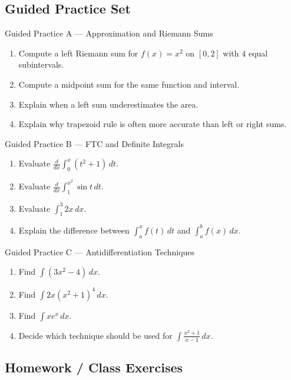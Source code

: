 \documentclass[11pt]{article}
\begin{document}
\newpage
\subsection{Guided Practice Set}

\begin{practicebox}{Guided Practice A --- Approximation and Riemann Sums}
\begin{enumerate}
    \item Compute a left Riemann sum for \(f(x)=x^2\) on \([0,2]\) with \(4\) equal subintervals.
    \item Compute a midpoint sum for the same function and interval.
    \item Explain when a left sum underestimates the area.
    \item Explain why trapezoid rule is often more accurate than left or right sums.
\end{enumerate}
\end{practicebox}

\begin{practicebox}{Guided Practice B --- FTC and Definite Integrals}
\begin{enumerate}
    \item Evaluate \(\frac{d}{dx}\int_0^x (t^2+1)\,dt\).
    \item Evaluate \(\frac{d}{dx}\int_1^{x^2}\sin t\,dt\).
    \item Evaluate \(\int_1^3 2x\,dx\).
    \item Explain the difference between \(\int_a^x f(t)\,dt\) and \(\int_a^b f(x)\,dx\).
\end{enumerate}
\end{practicebox}

\begin{practicebox}{Guided Practice C --- Antidifferentiation Techniques}
\begin{enumerate}
    \item Find \(\int (3x^2-4)\,dx\).
    \item Find \(\int 2x(x^2+1)^4\,dx\).
    \item Find \(\int xe^x\,dx\).
    \item Decide which technique should be used for \(\int \frac{x^2+1}{x-1}\,dx\).
\end{enumerate}
\end{practicebox}

\newpage
\subsection{Homework / Class Exercises}
\end{document}
